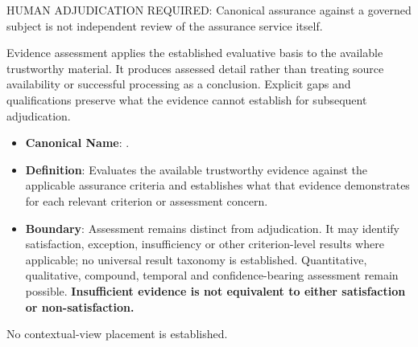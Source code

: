 HUMAN ADJUDICATION REQUIRED: Canonical assurance against a governed subject is not independent review of the assurance service itself.



Evidence assessment applies the established evaluative basis to the available trustworthy material. It produces assessed detail rather than treating source availability or successful processing as a conclusion. Explicit gaps and qualifications preserve what the evidence cannot establish for subsequent adjudication.



\begin{itemize}

\item
\textbf{Canonical Name}: \texttt{}.



\item
\textbf{Definition}: Evaluates the available trustworthy evidence against the applicable assurance criteria and establishes what that evidence demonstrates for each relevant criterion or assessment concern.



\item
\textbf{Boundary}: Assessment remains distinct from adjudication. It may identify satisfaction, exception, insufficiency or other criterion-level results where applicable; no universal result taxonomy is established. Quantitative, qualitative, compound, temporal and confidence-bearing assessment remain possible. \textbf{Insufficient evidence is not equivalent to either satisfaction or non-satisfaction.}



\end{itemize}





No contextual-view placement is established.


